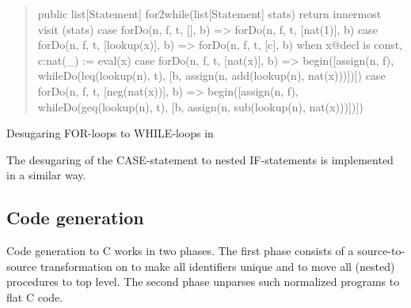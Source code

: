 \begin{listing}[t]
\begin{quote}
\begin{rascal}
public list[Statement] for2while(list[Statement] stats) {
 return innermost visit (stats) {
  case forDo(n, f, t, [], b) => forDo(n, f, t, [nat(1)], b)
  case forDo(n, f, t, [lookup(x)], b) => forDo(n, f, t, [c], b)
           when x@decl is const, c:nat(_) := eval(x)
  case forDo(n, f, t, [nat(x)], b) => 
           begin([assign(n, f), whileDo(leq(lookup(n), t), 
              [b, assign(n, add(lookup(n), nat(x)))])]) 
  case forDo(n, f, t, [neg(nat(x))], b) => 
           begin([assign(n, f), whileDo(geq(lookup(n), t), 
              [b, assign(n, sub(lookup(n), nat(x)))])]) 
 }
}
\end{rascal}
\end{quote}
\caption{Desugaring \oberon FOR-loops to WHILE-loops in
  \Rascal\label{LST:for2while}} 
\end{listing}

The desugaring of the CASE-statement to nested IF-statements is
implemented in a similar way.


\subsection{Code generation}

\noindent Code generation to C works in two phases. The first phase consists of a source-to-source transformation on \oberon to make all identifiers unique and to move all (nested) procedures to top level. The second phase unparses such normalized \oberon programs to flat C code.


